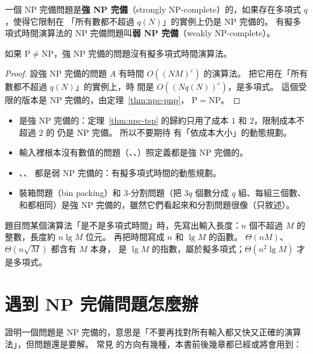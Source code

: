 \begin{definition}[強 NP 完備]
\label{def:npc-strong}
一個 NP 完備問題是\textbf{強 NP 完備}（strongly NP-complete）的，如果存在多項式 $q$，使得它限制在
「所有數都不超過 $q(N)$」的實例上仍是 NP 完備的。 有擬多項式時間演算法的 NP 完備問題叫\textbf{弱 NP
完備}（weakly NP-complete）。
\end{definition}

\begin{theorem}
\label{thm:npc-strong}
如果 $\mathrm{P} \ne \mathrm{NP}$，強 NP 完備的問題沒有擬多項式時間演算法。
\end{theorem}

\begin{proof}
設強 NP 完備的問題 $A$ 有時間 $O((NM)^c)$ 的演算法。 把它用在「所有數都不超過 $q(N)$」的實例上，時
間是 $O((N q(N))^c)$，是多項式。 這個受限的版本是 NP 完備的，由定理~\ref{thm:npc-pnp}，
$\mathrm{P} = \mathrm{NP}$。
\end{proof}

\begin{itemize}
\item {} 是強 NP 完備的：定理~\ref{thm:npc-tsp} 的歸約只用了成本 $1$ 和 $2$，限制成本不超過
$2$ 的  仍是 NP 完備。 所以不要期待  有「依成本大小」的動態規劃。
\item 輸入裡根本沒有數值的問題（、、）照定義都是強 NP 完備的。
\item {}、、 都是弱 NP 完備的：有擬多項式時間的動態規劃。
\item 裝箱問題（bin packing）和 3-分割問題（把 $3q$ 個數分成 $q$ 組、每組三個數、和都相同）是強 NP
完備的，雖然它們看起來和分割問題很像（只敘述）。
\end{itemize}

\begin{examnote}
題目問某個演算法「是不是多項式時間」時，先寫出輸入長度：$n$ 個不超過 $M$ 的整數，長度約
$n \lg M$ 位元。 再把時間寫成 $n$ 和 $\lg M$ 的函數。 $\Theta(nM)$、$\Theta(n\sqrt{M})$ 都含有 $M$ 本身，
是 $\lg M$ 的指數，屬於擬多項式；$\Theta(n^2 \lg M)$ 才是多項式。
\end{examnote}

\section{遇到 NP 完備問題怎麼辦}
\label{sec:npc-cope}

證明一個問題是 NP 完備的，意思是「不要再找對所有輸入都又快又正確的演算法」，但問題還是要解。 常見
的方向有幾種，本書前後幾章都已經或將會用到：

